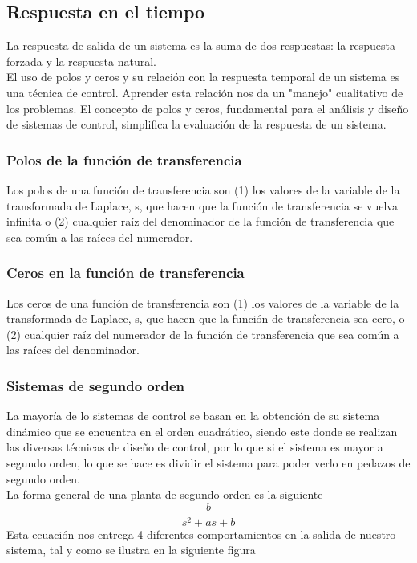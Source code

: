 \subsection{Respuesta en el tiempo}
La respuesta de salida de un sistema es la suma de dos respuestas: la respuesta forzada y la respuesta natural.\\
El uso de polos y ceros y su relación con la respuesta temporal de un sistema es una técnica de control. Aprender esta relación nos da un
"manejo" cualitativo de los problemas. El concepto de polos y ceros, fundamental para el análisis y diseño de sistemas de control, simplifica
la evaluación de la respuesta de un sistema.\cite{Book:Nise2010}
\subsubsection{Polos de la función de transferencia}
Los polos de una función de transferencia son (1) los valores de la variable de la transformada de Laplace, s, que hacen que la función de
transferencia se vuelva infinita o (2) cualquier raíz del denominador de la función de transferencia que sea común a las raíces del numerador.
\subsubsection{Ceros en la función de transferencia}
Los ceros de una función de transferencia son (1) los valores de la variable de la transformada de Laplace, s, que hacen que la función de
transferencia sea cero, o (2) cualquier raíz del numerador de la función de transferencia que sea común a las raíces del denominador.
\subsubsection{Sistemas de segundo orden}
La mayoría de lo sistemas de control se basan en la obtención de su sistema dinámico que se encuentra en el orden cuadrático, siendo este
donde se realizan las diversas técnicas de diseño de control, por lo que si el sistema es mayor a segundo orden, lo que se hace es dividir
el sistema para poder verlo en pedazos de segundo orden.\\
La forma general de una planta de segundo orden es la siguiente
\begin{equation}
	\frac{b}{s^2+as+b}
\end{equation}
Esta ecuación nos entrega 4 diferentes comportamientos en la salida de nuestro sistema, tal y como se ilustra en la siguiente figura

